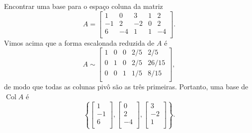 \begin{ex}
	Encontrar uma base para o espaço coluna da matriz
	\begin{equation}
	A = \left[
	\begin{array}{ccccc}
	1  & 0  & 3   & 1 & 2 \\
	-1 & 2  & -2  & 0 & 2 \\
	6  & -4 & 1   & 1 & -4 \\
	\end{array}
	\right].
	\end{equation} Vimos acima que a forma escalonada reduzida de $A$ é
	\begin{equation}
	A \sim
	\left[
	\begin{array}{ccccc}
	1  & 0  & 0  & 2/5 & 2/5  \\
	0  & 1  & 0  & 2/5 & 26/15  \\
	0  & 0  & 1  & 1/5 & 8/15 \\
	\end{array}
	\right],
	\end{equation} de modo que todas as colunas pivô são as três primeiras. Portanto, uma base de $\operatorname{Col} A$ é
	\begin{equation}
	\left\{
	\left[
	\begin{array}{c}
	1    \\
	-1  \\
	6    \\
	\end{array}
	\right],
	\left[
	\begin{array}{c}
	0   \\
	2   \\
	-4   \\
	\end{array}
	\right],
	\left[
	\begin{array}{c}
	3  \\
	-2 \\
	1  \\
	\end{array}
	\right]
	\right\}.
	\end{equation}
\end{ex}




